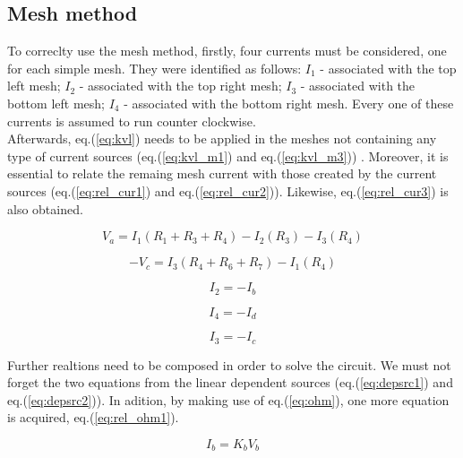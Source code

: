 \subsection{Mesh method}
\label{subsec:mesh_met}

To correclty use the mesh method, firstly, four currents must be considered, one for each simple mesh.
They were identified as follows: $I_1$ - associated with the top left mesh; $I_2$ - associated with
the top right mesh; $I_3$ - associated with the bottom left mesh; $I_4$ - associated with the bottom
right mesh. Every one of these currents is assumed to run counter clockwise. \\

Afterwards, eq.(\ref{eq:kvl}) needs to be applied in the meshes not containing any type of current
sources (eq.(\ref{eq:kvl_m1}) and eq.(\ref{eq:kvl_m3})) . Moreover, it is essential to relate the
remaing mesh current with those created by the current sources (eq.(\ref{eq:rel_cur1}) and
eq.(\ref{eq:rel_cur2})). Likewise, eq.(\ref{eq:rel_cur3}) is also obtained.

\begin{equation}
	V_a = I_1(R_1+R_3+R_4)-I_2(R_3)-I_3(R_4)
	\label{eq:kvl_m1}
\end{equation}

\begin{equation}
	-V_c = I_3(R_4+R_6+R_7)-I_1(R_4)
	\label{eq:kvl_m3}
\end{equation}

\begin{equation}
	I_2 = -I_b
	\label{eq:rel_cur1}
\end{equation}

\begin{equation}
	I_4 = -I_d
	\label{eq:rel_cur2}
\end{equation}

\begin{equation}
	I_3 = -I_c
	\label{eq:rel_cur3}
\end{equation}

Further realtions need to be composed in order to solve the circuit. We must not forget the two equations
from the linear dependent sources (eq.(\ref{eq:depsrc1}) and eq.(\ref{eq:depsrc2})). In adition, by
making use of eq.(\ref{eq:ohm}), one more equation is acquired, eq.(\ref{eq:rel_ohm1}).

\begin{equation}
	I_b = K_bV_b
	\label{eq:depsrc1}
\end{equation}

